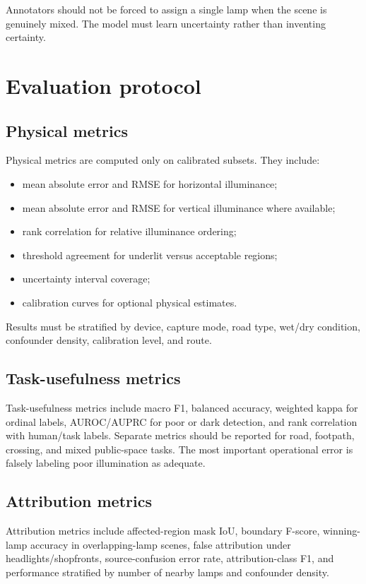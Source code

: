 \documentclass[11pt]{article}
\begin{document}
Annotators should not be forced to assign a single lamp when the scene is genuinely mixed. The model must learn uncertainty rather than inventing certainty.

\section{Evaluation protocol}

\subsection{Physical metrics}

Physical metrics are computed only on calibrated subsets. They include:
\begin{itemize}
  \item mean absolute error and RMSE for horizontal illuminance;
  \item mean absolute error and RMSE for vertical illuminance where available;
  \item rank correlation for relative illuminance ordering;
  \item threshold agreement for underlit versus acceptable regions;
  \item uncertainty interval coverage;
  \item calibration curves for optional physical estimates.
\end{itemize}

Results must be stratified by device, capture mode, road type, wet/dry condition, confounder density, calibration level, and route.

\subsection{Task-usefulness metrics}

Task-usefulness metrics include macro F1, balanced accuracy, weighted kappa for ordinal labels, AUROC/AUPRC for poor or dark detection, and rank correlation with human/task labels. Separate metrics should be reported for road, footpath, crossing, and mixed public-space tasks. The most important operational error is falsely labeling poor illumination as adequate.

\subsection{Attribution metrics}

Attribution metrics include affected-region mask IoU, boundary F-score, winning-lamp accuracy in overlapping-lamp scenes, false attribution under headlights/shopfronts, source-confusion error rate, attribution-class F1, and performance stratified by number of nearby lamps and confounder density.
\end{document}
